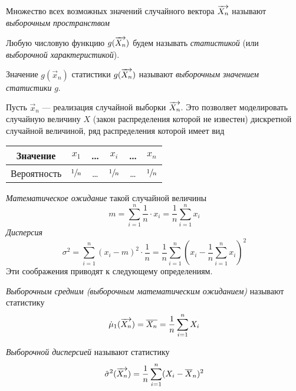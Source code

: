 \begin{defn}
		Множество всех возможных значений случайного вектора $\overrightarrow{X_n}$ называют \emph{выборочным пространством}
\end{defn}

\begin{defn}
	Любую числовую  функцию $g(\overrightarrow{X_n})$ будем называть \emph{статистикой} (или \emph{выборочной характеристикой}).
\end{defn}
\begin{rem}
	Значение $g(\vec{x}_n)$ статистики $g(\overrightarrow{X_n})$ называют \emph{выборочным значением статистики} $g$.
\end{rem}
\begin{rem}
	Пусть $\vec{x}_n$ --- реализация случайной выборки $\overrightarrow{X_n}$. Это позволяет моделировать случайную величину $X$ (закон распределения которой не известен) дискретной случайной величиной, ряд распределения которой имеет вид
	\begin{center}\begin{tabular}{| c || c | c | c | c | c |}
		\hline
		Значение & $x_1$ & \ldots & $x_i$ & \ldots & $x_n$ \\
		\hline
		Вероятность & $\sfrac{1}{n}$ & \ldots & $\sfrac{1}{n}$ & \ldots & $\sfrac{1}{n}$ \\
		\hline
	\end{tabular}\end{center}
	\emph{Математическое ожидание} такой случайной величины
	\[
		m = \sum_{i = 1}^{n} \frac{1}{n} \cdot x_i = \frac{1}{n} \sum_{i = 1}^{n} x_i
	\]
	\emph{Дисперсия}
	\[
		\sigma^2 = \sum_{i = 1}^{n} (x_i - m)^2 \cdot \frac{1}{n} = \frac{1}{n} \sum_{i = 1}^{n} \left(x_i - \frac{1}{n} \sum_{i = 1}^{n} x_i\right)^2
	\]
	Эти соображения приводят к следующему определениям.
\end{rem}

\begin{defn}
	\emph{Выборочным средним (выборочным математическим ожиданием)} называют статистику 
	\begin{equation}
		\dot{\mu}_1(\overrightarrow{X_n}) = \overline{X_n} = \frac{1}{n} \sum_{i = 1}^{n} X_i
	\end{equation}
\end{defn}

\begin{defn}
	\emph{Выборочной дисперсией} называют статистику 
	\begin{equation}
		\hat{\sigma}^2(\overrightarrow{X_n}) = \frac{1}{n} \sum_{i = 1}^{n} (X_i - \overline{X}_n)^2
	\end{equation}
\end{defn}

